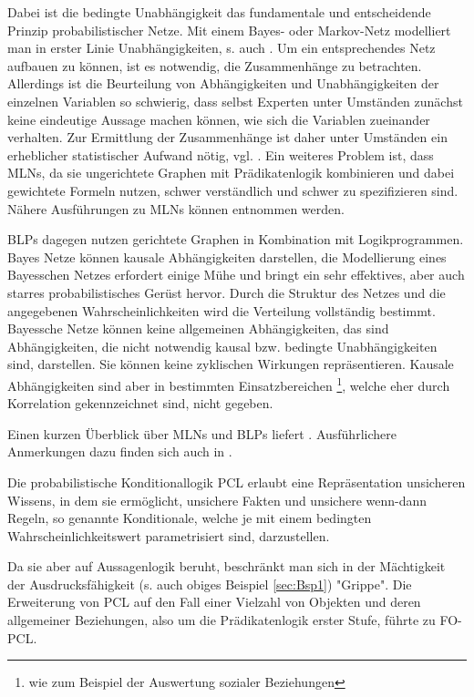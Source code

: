 \documentclass[draft]{scrreprt}
\begin{document}
Dabei ist die bedingte Unabhängigkeit das fundamentale und entscheidende Prinzip probabilistischer Netze. Mit einem Bayes- oder Markov-Netz modelliert man in erster Linie Unabhängigkeiten, s. auch \cite[Kap. 12.1 und 12.2]{BKI08}. Um ein entsprechendes Netz aufbauen zu können, ist es notwendig, die Zusammenhänge zu betrachten. Allerdings ist die Beurteilung von Abhängigkeiten und Unabhängigkeiten der einzelnen Variablen so schwierig, dass selbst Experten unter Umständen zunächst keine eindeutige Aussage machen können, wie sich die Variablen zueinander verhalten. Zur Ermittlung der Zusammenhänge ist daher unter Umständen ein erheblicher statistischer Aufwand nötig, vgl. \cite[12.6, S. 402 /403]{BKI08}.
 Ein weiteres Problem ist, dass MLNs, da sie ungerichtete Graphen mit Prädikatenlogik kombinieren und dabei gewichtete Formeln nutzen, schwer verständlich und schwer zu spezifizieren sind. Nähere Ausführungen zu MLNs können \cite{DR06} entnommen werden. 
 
 BLPs dagegen nutzen gerichtete Graphen in Kombination mit Logikprogrammen. Bayes Netze können kausale Abhängigkeiten darstellen, die Modellierung eines Bayesschen Netzes erfordert einige Mühe und bringt ein sehr effektives, aber auch starres probabilistisches Gerüst hervor. Durch die Struktur des Netzes und die angegebenen Wahrscheinlichkeiten wird die Verteilung vollständig bestimmt. Bayessche Netze können keine allgemeinen Abhängigkeiten, das sind Abhängigkeiten, die nicht notwendig kausal bzw. bedingte Unabhängigkeiten sind, darstellen. Sie können keine zyklischen Wirkungen repräsentieren. Kausale Abhängigkeiten sind aber in bestimmten Einsatzbereichen \footnote {wie zum Beispiel der Auswertung sozialer Beziehungen}, welche eher durch Korrelation gekennzeichnet sind, nicht gegeben.
 
Einen kurzen Überblick über MLNs und BLPs liefert \cite[Kap. 2.1 und 2.2]{FLT09}.
Ausführlichere Anmerkungen dazu finden sich auch in \cite[Kap. 2]{KIBFT11}.

Die probabilistische Konditionallogik PCL   erlaubt eine Repräsentation unsicheren Wissens, in dem sie ermöglicht,  unsichere Fakten und unsichere wenn-dann Regeln, so genannte Konditionale, welche je mit einem bedingten Wahrscheinlichkeitswert parametrisiert sind, darzustellen. 

Da sie aber auf Aussagenlogik beruht, beschränkt man sich in der Mächtigkeit der Ausdrucksfähigkeit (s. auch obiges Beispiel \ref{sec:Bsp1}) "{}Grippe"{}. Die Erweiterung von PCL auf den Fall einer Vielzahl von Objekten und deren allgemeiner Beziehungen, also um die Prädikatenlogik erster Stufe, führte zu FO-PCL.
\end{document}
